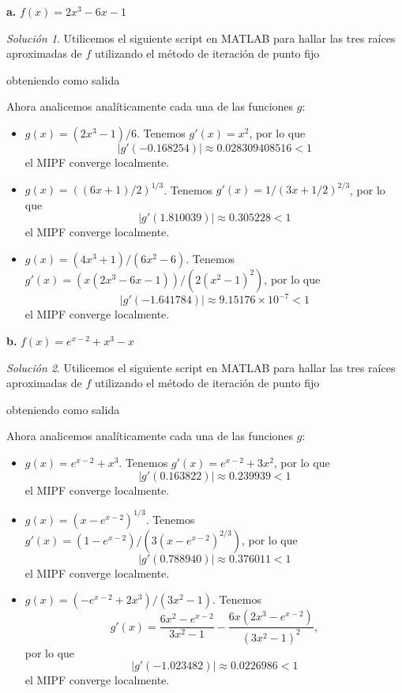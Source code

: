 \documentclass{article}
\newenvironment{statement}[1]{\smallskip\noindent\color[rgb]{1.00,0.00,0.50} {\bf #1.}}{}
\theoremstyle{definition}
\theoremstyle{remark}
\newtheorem*{solution}{Soluci\'on}
\begin{document}
\begin{statement}{a}
  $f(x) = 2x^3 - 6x - 1$
\end{statement}

\begin{solution}
  Utilicemos el siguiente script en MATLAB para hallar las tres ra\'ices aproximadas
  de $f$ utilizando el m\'etodo de iteraci\'on de punto fijo
  
  obteniendo como salida

  

  Ahora analicemos anal\'iticamente cada una de las funciones $g$:
  \begin{itemize}
    \item $g(x) = (2x^3 - 1) / 6$. Tenemos $g'(x) = x^2$, por lo que
    \[
      |g'(-0.168254)| \approx 0.028309408516 < 1
    \]
    el MIPF converge localmente.
    \item $g(x) = ((6x + 1) / 2)^{1 / 3}$. Tenemos $g'(x) = 1 / (3x + 1/2)^{2 / 3}$, por lo que
    \[
      |g'(1.810039)| \approx 0.305228 < 1  
    \]
    el MIPF converge localmente.
    \item $g(x) = (4x^3 + 1) / (6x^2 - 6)$. Tenemos $g'(x) = (x (2x^3 - 6x - 1)) / (2(x^2 - 1)^2)$, por lo que
    \[
      |g'(-1.641784)| \approx 9.15176 \times 10^{-7}< 1
    \]
    el MIPF converge localmente.
  \end{itemize}
\end{solution}

\begin{statement}{b}
  $f(x) = e^{x - 2} + x^3 - x$
\end{statement}

\begin{solution}
  Utilicemos el siguiente script en MATLAB para hallar las tres ra\'ices aproximadas
  de $f$ utilizando el m\'etodo de iteraci\'on de punto fijo
  
  obteniendo como salida

  

  Ahora analicemos anal\'iticamente cada una de las funciones $g$:
  \begin{itemize}
    \item $g(x) = e^{x - 2} + x^3$. Tenemos $g'(x) = e^{x - 2} + 3x^2$, por lo que
    \[
      |g'(0.163822)| \approx 0.239939 < 1
    \]
    el MIPF converge localmente.
    \item $g(x) = (x - e^{x - 2})^{1 / 3}$. Tenemos $g'(x) = (1 - e^{x - 2}) / (3(x - e^{x - 2})^{2 / 3})$, por lo que
    \[
      |g'(0.788940)| \approx 0.376011 < 1
    \]
    el MIPF converge localmente.
    \item $g(x) = (-e^{x - 2} + 2x^3) / (3x^2 - 1)$. Tenemos
    \[
      g'(x) = \frac{6x^2 - e^{x - 2}}{3x^2 - 1} - \frac{6x(2x^3 - e^{x - 2})}{(3x^2 - 1)^2},
    \]
    por lo que
    \[
      |g'(-1.023482)| \approx 0.0226986 < 1
    \]
    el MIPF converge localmente.
  \end{itemize}
\end{solution}
\end{document}
